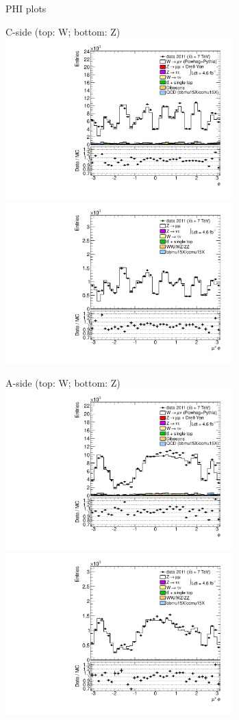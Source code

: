 {
\Huge PHI plots
}


{

\colb[T]

C-side (top: W; bottom: Z)
\centering
\includegraphics[width=0.66\textwidth]{dates/20130306/figures/etaphi/W_1_C_stack_l_phi_POS} \\
\includegraphics[width=0.66\textwidth]{dates/20130306/figures/etaphi/Z_1_C_stack_lP_phi_ALL.pdf}

A-side (top: W; bottom: Z)
\centering
\includegraphics[width=0.66\textwidth]{dates/20130306/figures/etaphi/W_1_A_stack_l_phi_POS} \\
\includegraphics[width=0.66\textwidth]{dates/20130306/figures/etaphi/Z_1_A_stack_lP_phi_ALL.pdf} 

\cole
}


